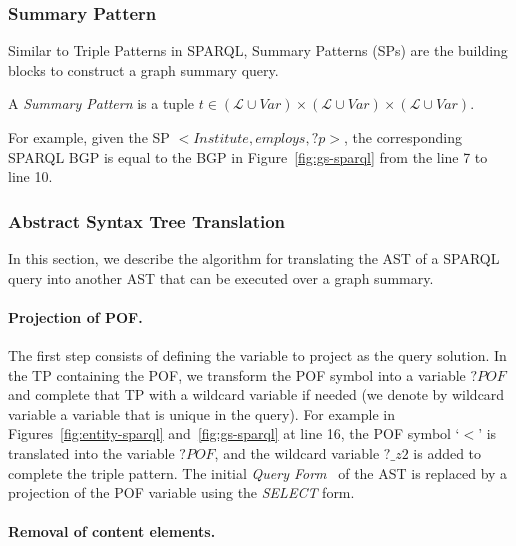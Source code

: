 \subsubsection{Summary Pattern}

Similar to Triple Patterns in SPARQL, Summary Patterns (SPs) are the building blocks to construct a graph summary query.

\begin{definition}
A \emph{Summary Pattern} is a tuple $t \in  (\mathcal{L} \cup Var) \times (\mathcal{L} \cup Var) \times (\mathcal{L} \cup Var)$.
\label{def:summary-triple-pattern}
\end{definition}

For example, given the SP \mbox{$<Institute, employs, ?p>$}, the corresponding SPARQL BGP is equal to the BGP in Figure~\ref{fig:gs-sparql} from the line 7 to line 10.

\subsubsection{Abstract Syntax Tree Translation}

In this section, we describe the algorithm for translating the AST of a SPARQL query into another AST that can be executed over a graph summary.

\paragraph{Projection of POF.}

The first step consists of defining the variable to project as the query solution. In the TP containing the POF, we transform the POF symbol into a variable $?POF$ and complete that TP with a wildcard variable if needed (we denote by wildcard variable a variable that is unique in the query). For example in Figures~\ref{fig:entity-sparql} and~\ref{fig:gs-sparql} at line 16, the POF symbol `$<$' is translated into the variable $?POF$, and the wildcard variable $?\_z2$ is added to complete the triple pattern.
The initial \emph{Query Form}~\cite{PrudS08} of the AST is replaced by a projection of the POF variable using the \emph{SELECT} form.

\paragraph{Removal of content elements.}

